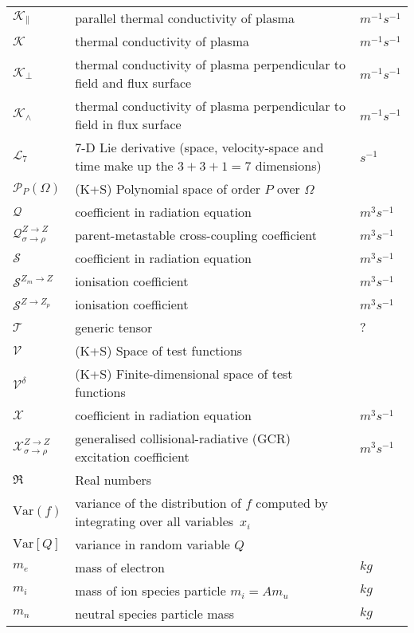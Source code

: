\begin{longtable}{|p{3.0cm}|p{10.0cm}|p{3.0cm}|}
$\mathcal{K}_{\|}$ & parallel thermal conductivity of plasma & $m^{-1}s^{-1}$ \\
$\mathcal{K}$ & thermal conductivity of plasma & $m^{-1}s^{-1}$ \\
$\mathcal{K}_{\perp}$ & thermal conductivity of plasma perpendicular to field and flux surface & $m^{-1}s^{-1}$ \\
$\mathcal{K}_{\wedge}$ & thermal conductivity of plasma perpendicular to field in flux surface & $m^{-1}s^{-1}$ \\
$\mathcal{L}_7$ & 7-D Lie derivative (space, velocity-space and time make up the $3+3+1=7$ dimensions)  & $s^{-1}$ \\
$\mathcal{P}_{P}(\Omega)$ &  (K+S) Polynomial space of order $P$ over $\Omega$ & \\
$\mathcal{Q}$ & coefficient in radiation equation  & $m^3 s^{-1}$ \\
$\mathcal{Q}_{\sigma \rightarrow \rho}^{Z\rightarrow Z}$ & parent-metastable cross-coupling coefficient  & $m^3 s^{-1}$ \\
$\mathcal{S}$ & coefficient in radiation equation  & $m^3 s^{-1}$ \\
$\mathcal{S}^{Z_m\rightarrow Z}$ & ionisation coefficient  & $m^3 s^{-1}$ \\
$\mathcal{S}^{Z\rightarrow Z_p}$ & ionisation coefficient  & $m^3 s^{-1}$ \\
$\mathcal{T}$ & generic tensor & $?$ \\
$\mathcal{V}$ &  (K+S) Space of test functions & \\
$\mathcal{V}^{\delta}$ &  (K+S) Finite-dimensional space of test functions & \\
$\mathcal{X}$ & coefficient in radiation equation  & $m^3 s^{-1}$ \\
$\mathcal{X}_{\sigma \rightarrow \rho}^{Z\rightarrow Z}$ & generalised collisional-radiative (GCR) excitation coefficient  & $m^3 s^{-1}$ \\
$\mathfrak{R}$ & Real numbers & \\
$\mathrm{Var}(f)$ & variance of the distribution of $f$ computed by integrating over all variables~$x_i$  & \\
$\mathrm{Var}[Q]$ & variance in random variable $Q$  & \\
$m_e$ & mass of electron & $kg$ \\
$m_i$ & mass of ion species particle $m_i= A m_u$ & $kg$ \\
$m_n$ & neutral species particle mass & $kg$ \\

\end{longtable}
